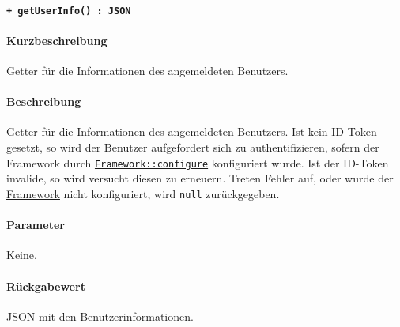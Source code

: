 \paragraph{\texttt{+ getUserInfo() : JSON}}\label{AP_Framework_getUserInfo}%
\paragraph*{Kurzbeschreibung}
Getter für die Informationen des angemeldeten Benutzers.
\paragraph*{Beschreibung}
Getter für die Informationen des angemeldeten Benutzers.
Ist kein ID-Token gesetzt, so wird der Benutzer aufgefordert sich zu authentifizieren, sofern der Framework durch \hyperref[AP_Framework_configure]{\texttt{Framework::configure}} konfiguriert wurde.
Ist der ID-Token invalide, so wird versucht diesen zu erneuern.
Treten Fehler auf, oder wurde der \hyperref[AP_Framework]{Framework} nicht konfiguriert, wird \verb#null# zurückgegeben.
\paragraph*{Parameter}
Keine.
\paragraph*{Rückgabewert}
JSON mit den Benutzerinformationen.